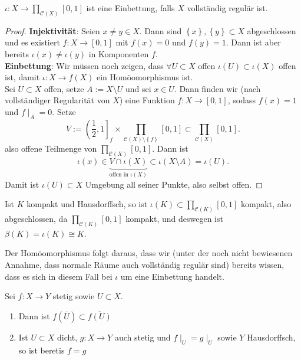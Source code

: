 \begin{theorem}\label{thm:stone-cech-kompaktifizierung-ist-einbettung-für-vollständig-reguläre-räume}
     $ι: X \to  \prod_{\mathcal{C}(X)}[0,1]$ ist eine Einbettung, falls $X$ vollständig regulär ist.
\end{theorem}
\begin{proof}
    \textbf{Injektivität}: Seien $x\neq y\in X$. Dann sind $\left \{x\right\} ,\left \{y\right\} \subset X$ abgeschlossen und es existiert $f: X \to  [0,1]$ mit $f(x) = 0$ und  $f(y) = 1$. Dann ist aber bereits  $ι(x) \neq  ι(y)$ in Komponenten $f$. \\
    \textbf{Einbettung}: Wir müssen noch zeigen, dass $\forall  U\subset X$ offen $ι(U) \subset ι(X)$ offen ist, damit $ι : X \to  f(X)$ ein Homöomorphismus ist. \\
    Sei $U\subset X$ offen, setze $A := X\setminus U$ und sei $x\in U$. Dann finden wir (nach vollständiger Regularität von $X$) eine Funktion  $f: X \to  [0,1]$, sodass $f(x) = 1$ und  $f\mid _{A} = 0$. Setze
    \[
        V := \left( \frac{1}{2},1 \right]_f \times \prod_{\mathcal{C}(X) \setminus \left \{f\right\} } [0,1] \subset \prod_{\mathcal{C}(X)} [0,1]
    .\] 
    also offene Teilmenge von $\prod_{\mathcal{C}(X)} [0,1]$. Dann ist
    \[
        ι(x) \in \underbrace{V \cap  ι(X)}_{\text{offen in } ι(X)} \subset ι(X \setminus A) = ι(U)
    .\] 
    Damit ist $ι(U)\subset X$ Umgebung all seiner Punkte, also selbst offen.
\end{proof}
\begin{remark}
    Ist $K$ kompakt und Hausdorffsch, so ist  $ι(K) \subset \prod_{\mathcal{C}(K)} [0,1]$ kompakt, also abgeschlossen, da $\prod_{\mathcal{C}(K)} [0,1]$ kompakt, und deswegen ist $β(K) = ι(K) \cong K$.
\end{remark}
\begin{remark*}
    Der Homöomorphismus folgt daraus, dass wir (unter der noch nicht bewiesenen Annahme, dass normale Räume auch vollständig regulär sind) bereits wissen, dass es sich in diesem Fall bei $ι$ um eine Einbettung handelt.
\end{remark*}
\begin{lemma}\label{lm:fortsetzung-stetiger-funktionen-in-dichten-hausdorff-räumen-sind-eindeutig}
   Sei $f: X \to  Y$ stetig sowie $U\subset X$.
   \begin{enumerate}[1)]
       \item Dann ist $f(\overline{U}) \subset \overline{f(U)}$ 
       \item Ist $U\subset X$ dicht, $g: X\to Y$ auch stetig und $f\mid _ U = g\mid _U$ sowie $Y$ Hausdorffsch, so ist beretis  $f=g$
   \end{enumerate}
\end{lemma}
